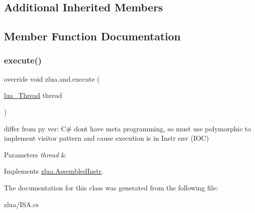 \subsection*{Additional Inherited Members}


\subsection{Member Function Documentation}
\mbox{\label{classzlua_1_1and_ad1ef9d7bf03b778753264a15bbd6ac04}} 
\subsubsection{\texorpdfstring{execute()}{execute()}}
{\footnotesize\ttfamily override void zlua.\+and.\+execute (\begin{DoxyParamCaption}\item[{\mbox{\hyperlink{classzlua_1_1lua___thread}{lua\+\_\+\+Thread}}}]{thread }\end{DoxyParamCaption})\hspace{0.3cm}{\ttfamily [virtual]}}



differ from py ver\+: C\# dont have meta programming, so must use polymorphic to implement visitor pattern and cause execution is in Instr env (I\+OC) 


\begin{DoxyParams}{Parameters}
{\em thread} & \\
\hline
\end{DoxyParams}


Implements \mbox{\hyperlink{classzlua_1_1_assembled_instr_a44e081c4565b90b75e4a67b8dd418feb}{zlua.\+Assembled\+Instr}}.



The documentation for this class was generated from the following file\+:\begin{DoxyCompactItemize}
\item 
zlua/I\+S\+A.\+cs\end{DoxyCompactItemize}
